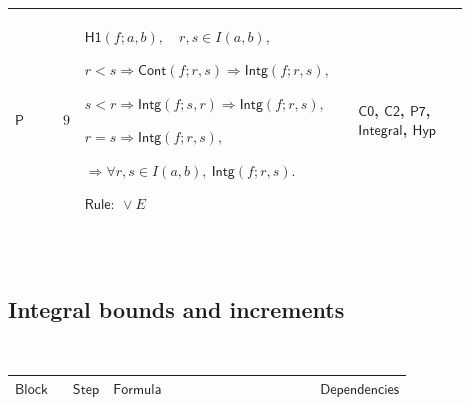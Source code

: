 \documentclass[12pt,reqno]{amsart}
\theoremstyle{blueplain}
\numberwithin{equation}{section}
\newlength{\FTCOneColumnBody}
\begin{document}
{\scriptsize \setlength{\parskip}{0pt}\nointerlineskip
\noindent 
\begin{tabular}{|@{}>{\centering\arraybackslash}m{0.10658\linewidth}|>{\centering\arraybackslash}m{0.03553\linewidth}|>{\centering\arraybackslash}m{0.52105\linewidth}|>{\centering\arraybackslash}m{0.23684\linewidth}|}
\hline
\hypertarget{proof:P9}{$\displaystyle \mathsf{P}$} & $\displaystyle 9$ & $%
\displaystyle \mathsf{H1}(f;a,b),\quad r,s\in I(a,b),$\par$\displaystyle %
r<s\Rightarrow\mathsf{Cont}(f;r,s)\Rightarrow\mathsf{Intg}(f;r,s),$\par$%
\displaystyle s<r\Rightarrow\mathsf{Intg}(f;s,r)\Rightarrow\mathsf{Intg}%
(f;r,s),$\par$\displaystyle r=s\Rightarrow\mathsf{Intg}(f;r,s),$\par$%
\displaystyle \Rightarrow\forall r,s\in I(a,b),\ \mathsf{Intg}(f;r,s).$\par$%
\displaystyle \mathsf{Rule}:\ \lor E$ & \hyperlink{proof:C0}{$\displaystyle 
\mathsf{C0}$}, \hyperlink{proof:C2}{$\displaystyle \mathsf{C2}$}, \hyperlink{proof:P7}%
{$\displaystyle \mathsf{P7}$}, \hyperlink{def:Integral}{$\displaystyle 
\mathsf{Integral}$}, \hyperlink{def:Hyp}{$\displaystyle \mathsf{Hyp}$} \\ 
\hline
\end{tabular}%
}

{\scriptsize \ }

\subsection{\protect\scriptsize Integral bounds and increments}

{\scriptsize {\ }}

{\scriptsize \setlength{\parskip}{0pt}\nointerlineskip
\noindent 
\begin{tabular}{|@{}>{\centering\arraybackslash}m{\FTCOneColumnBody}|}
\hline
$\displaystyle \mathsf{IntegralBoundsAndIncrements}$ \\ \hline
\end{tabular}%
}

{\scriptsize \setlength{\parskip}{0pt}\nointerlineskip
\noindent 
\begin{tabular}{|@{}>{\centering\arraybackslash}m{0.10658\linewidth}|>{\centering\arraybackslash}m{0.03553\linewidth}|>{\centering\arraybackslash}m{0.52105\linewidth}|>{\centering\arraybackslash}m{0.23684\linewidth}|}
\hline
$\displaystyle \mathsf{Block}$ & $\displaystyle \mathsf{Step}$ & $%
\displaystyle \mathsf{Formula}$ & $\displaystyle \mathsf{Dependencies}$ \\ 
\hline
\end{tabular}%
}
\end{document}
